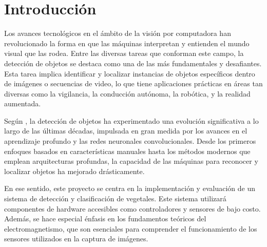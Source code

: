 \vspace*{\fill}

\section{Introducción}

  Los avances tecnológicos en el ámbito de la visión por computadora han revolucionado la forma en que las máquinas interpretan y entienden el mundo visual que las rodea. Entre las diversas tareas que conforman este campo, la detección de objetos se destaca como una de las más fundamentales y desafiantes. Esta tarea implica identificar y localizar instancias de objetos específicos dentro de imágenes o secuencias de video, lo que tiene aplicaciones prácticas en áreas tan diversas como la vigilancia, la conducción autónoma, la robótica, y la realidad aumentada. 

  Según \cite{Zou2019}, la detección de objetos ha experimentado una evolución significativa a lo largo de las últimas décadas, impulsada en gran medida por los avances en el aprendizaje profundo y las redes neuronales convolucionales. Desde los primeros enfoques basados en características manuales hasta los métodos modernos que emplean arquitecturas profundas, la capacidad de las máquinas para reconocer y localizar objetos ha mejorado drásticamente.

  En ese sentido, este proyecto se centra en la implementación y evaluación de un sistema de detección y clasificación de vegetales. Este sistema utilizará componentes de hardware accesibles como controladores y sensores de bajo costo. Además, se hace especial énfasis en los fundamentos teóricos del electromagnetismo, que son esenciales para comprender el funcionamiento de los sensores utilizados en la captura de imágenes.

\vspace*{\fill}